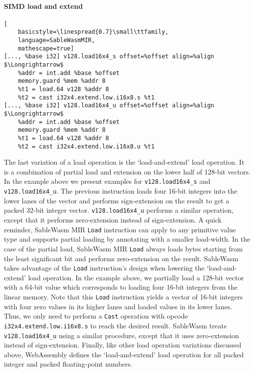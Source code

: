 \paragraph{SIMD load and extend} \quad
\begin{lstlisting}[
    basicstyle=\linespread{0.7}\small\ttfamily, 
    language=SableWasmMIR, 
    mathescape=true]
[..., %base i32] v128.load16x4_s offset=%offset align=%align $\Longrightarrow$
    %addr = int.add %base %offset
    memory.guard %mem %addr 8
    %t1 = load.64 v128 %addr 8
    %t2 = cast i32x4.extend.low.i16x8.s %t1
[..., %base i32] v128.load16x4_u offset=%offset align=%align $\Longrightarrow$
    %addr = int.add %base %offset
    memory.guard %mem %addr 8
    %t1 = load.64 v128 %addr 8
    %t2 = cast i32x4.extend.low.i16x8.u %t1
\end{lstlisting}
The last variation of a load operation is the `load-and-extend' load operation.
It is a combination of partial load and extension on the lower half of
128-bit vectors. In the example above we present examples for
\texttt{v128.load16x4\_s} and \texttt{v128.load16x4\_u}. The previous
instruction loads four 16-bit integers into the lower lanes of the vector and
performs sign-extension on the result to get a packed 32-bit integer vector.
\texttt{v128.load16x4\_u} performs a similar operation, except that it performs
zero-extension instead of sign-extension. A quick reminder, SableWasm MIR
\texttt{Load} instruction can apply to any primitive value type and supports
partial loading by annotating with a smaller load-width. In the case of the
partial load, SableWasm MIR \texttt{Load} always loads bytes starting from the
least significant bit and performs zero-extension on the result. SableWasm takes
advantage of the \texttt{Load} instruction's design when lowering the
`load-and-extend' load operation. In the example above, we partially load a
128-bit vector with a 64-bit value which corresponds to loading four
16-bit integers from the linear memory. Note that this \texttt{Load} instruction
yields a vector of 16-bit integers with four zero values in its higher lanes and
loaded values in its lower lanes. Thus, we only need to perform a \texttt{Cast}
operation with opcode \texttt{i32x4.extend.low.i16x8.s} to reach the desired
result. SableWasm treats \texttt{v128.load16x4\_u} using a similar procedure,
except that it uses zero-extension instead of sign-extension. Finally, like
other load operation variations discussed above, WebAssembly defines the
`load-and-extend' load operation for all packed integer and packed
floating-point numbers.

